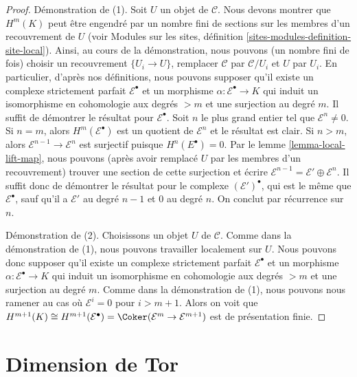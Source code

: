 \begin{proof}
Démonstration de (1). Soit $U$ un objet de $\mathcal{C}$. Nous devons montrer
que $H^m(K)$ peut être engendré par un nombre fini de sections sur les membres
d'un recouvrement de $U$ (voir Modules sur les sites, définition
\ref{sites-modules-definition-site-local}). Ainsi, au cours de la
démonstration, nous pouvons (un nombre fini de fois) choisir un recouvrement
$\{U_i \to U\}$, remplacer $\mathcal{C}$ par $\mathcal{C}/U_i$ et $U$ par
$U_i$. En particulier, d'après nos définitions, nous pouvons supposer qu'il
existe un complexe strictement parfait $\mathcal{E}^\bullet$ et un morphisme
$\alpha : \mathcal{E}^\bullet \to K$ qui induit un isomorphisme en cohomologie
aux degrés $> m$ et une surjection au degré $m$. Il suffit de démontrer le
résultat pour $\mathcal{E}^\bullet$. Soit $n$ le plus grand entier tel que
$\mathcal{E}^n \not = 0$. Si $n = m$, alors
$H^m(\mathcal{E}^\bullet)$ est un quotient de $\mathcal{E}^n$ et le résultat
est clair. Si $n > m$, alors $\mathcal{E}^{n - 1} \to \mathcal{E}^n$ est
surjectif puisque $H^n(E^\bullet) = 0$. Par le lemme
\ref{lemma-local-lift-map}, nous pouvons (après avoir remplacé $U$ par les
membres d'un recouvrement) trouver une section de cette surjection et écrire
$\mathcal{E}^{n - 1} = \mathcal{E}' \oplus \mathcal{E}^n$. Il suffit donc de
démontrer le résultat pour le complexe $(\mathcal{E}')^\bullet$, qui est le
même que $\mathcal{E}^\bullet$, sauf qu'il a $\mathcal{E}'$ au degré $n - 1$
et $0$ au degré $n$. On conclut par récurrence sur $n$.

\medskip\noindent
Démonstration de (2). Choisissons un objet $U$ de $\mathcal{C}$. Comme dans
la démonstration de (1), nous pouvons travailler localement sur $U$. Nous
pouvons donc supposer qu'il existe un complexe strictement parfait
$\mathcal{E}^\bullet$ et un morphisme
$\alpha : \mathcal{E}^\bullet \to K$ qui induit un isomorphisme en cohomologie
aux degrés $> m$ et une surjection au degré $m$. Comme dans la démonstration
de (1), nous pouvons nous ramener au cas où $\mathcal{E}^i = 0$ pour
$i > m + 1$. Alors on voit que
$H^{m + 1}(K) \cong H^{m + 1}(\mathcal{E}^\bullet) =
\Coker(\mathcal{E}^m \to \mathcal{E}^{m + 1})$
est de présentation finie.
\end{proof}








\section{Dimension de Tor}
\label{section-tor}

